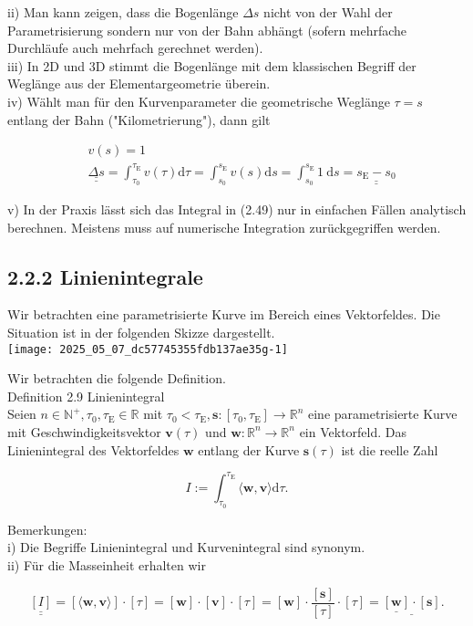 \documentclass[10pt]{article}
\begin{document}
ii) Man kann zeigen, dass die Bogenlänge $\Delta s$ nicht von der Wahl der Parametrisierung sondern nur von der Bahn abhängt (sofern mehrfache Durchläufe auch mehrfach gerechnet werden).\\
iii) In 2D und 3D stimmt die Bogenlänge mit dem klassischen Begriff der Weglänge aus der Elementargeometrie überein.\\
iv) Wählt man für den Kurvenparameter die geometrische Weglänge $\tau=s$ entlang der Bahn ("Kilometrierung"), dann gilt


\begin{align*}
& v(s)=1  \tag{2.51}\\
& \underline{\underline{\Delta s}}=\int_{\tau_{0}}^{\tau_{\mathrm{E}}} v(\tau) \mathrm{d} \tau=\int_{s_{0}}^{s_{\mathrm{E}}} v(s) \mathrm{d} s=\int_{s_{0}}^{s_{\mathrm{E}}} 1 \mathrm{~d} s=\underline{\underline{s_{\mathrm{E}}-s_{0}}} \tag{2.52}
\end{align*}


v) In der Praxis lässt sich das Integral in (2.49) nur in einfachen Fällen analytisch berechnen. Meistens muss auf numerische Integration zurückgegriffen werden.

\subsection*{2.2.2 Linienintegrale}
Wir betrachten eine parametrisierte Kurve im Bereich eines Vektorfeldes. Die Situation ist in der folgenden Skizze dargestellt.\\
\texttt{[image: 2025\_05\_07\_dc57745355fdb137ae35g-1]}

Wir betrachten die folgende Definition.\\
Definition 2.9 Linienintegral\\
Seien $n \in \mathbb{N}^{+}, \tau_{0}, \tau_{\mathrm{E}} \in \mathbb{R}$ mit $\tau_{0}<\tau_{\mathrm{E}}, \mathbf{s}:\left[\tau_{0}, \tau_{\mathrm{E}}\right] \rightarrow \mathbb{R}^{n}$ eine parametrisierte Kurve mit Geschwindigkeitsvektor $\mathbf{v}(\tau)$ und $\mathbf{w}: \mathbb{R}^{n} \rightarrow \mathbb{R}^{n}$ ein Vektorfeld. Das Linienintegral des Vektorfeldes $\mathbf{w}$ entlang der Kurve $\mathbf{s}(\tau)$ ist die reelle Zahl


\begin{equation*}
I:=\int_{\tau_{0}}^{\tau_{\mathrm{E}}}\langle\mathbf{w}, \mathbf{v}\rangle \mathrm{d} \tau . \tag{2.53}
\end{equation*}


Bemerkungen:\\
i) Die Begriffe Linienintegral und Kurvenintegral sind synonym.\\
ii) Für die Masseinheit erhalten wir


\begin{equation*}
\underline{\underline{[I]}}=[\langle\mathbf{w}, \mathbf{v}\rangle] \cdot[\tau]=[\mathbf{w}] \cdot[\mathbf{v}] \cdot[\tau]=[\mathbf{w}] \cdot \frac{[\mathbf{s}]}{[\tau]} \cdot[\tau]=\underline{\underline{[\mathbf{w}]} \cdot[\mathbf{s}]} . \tag{2.54}
\end{equation*}
\end{document}
